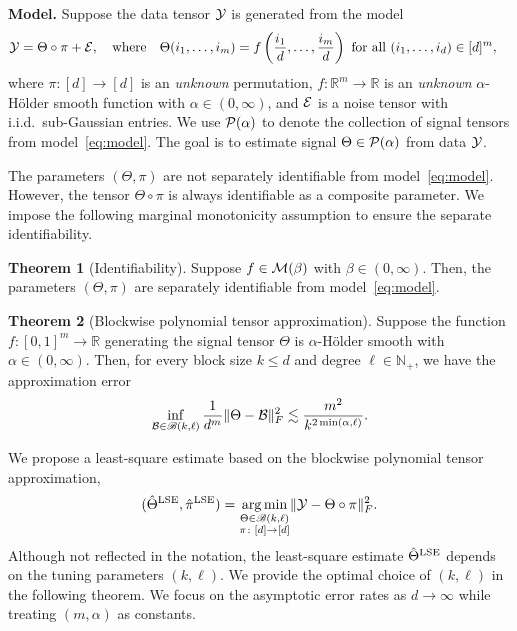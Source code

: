 \documentclass[11pt]{article}
\theoremstyle{definition}
\newtheorem{thm}{Theorem}
\def\caliB{\mathscr{B}}
\begin{document}
{\bf Model.} Suppose the data tensor $\mathcal{Y}$ is generated from the model
\begin{align}\label{eq:model}
\mathcal{Y}=\Theta\circ \pi+\mathcal{E},\quad \text{where}\quad \Theta(i_1,\ldots,i_m)&=f\left({i_1\over d}, \ldots,{i_m\over d}\right)\ \text{for all }(i_1,\ldots,i_d)\in[d]^m,
\end{align}
where $\pi\colon[d]\to[d]$ is an \emph{unknown} permutation, $f\colon \mathbb{R}^m\to\mathbb{R}$ is an \emph{unknown} $\alpha$-H\"older smooth function with $\alpha\in(0,\infty)$, and $\mathcal{E}$ is a noise tensor with i.i.d.\ sub-Gaussian entries. We use $\mathcal{P}(\alpha)$ to denote the collection of signal tensors from model~\eqref{eq:model}. The goal is to estimate signal $\Theta\in\mathcal{P}(\alpha)$ from data $\mathcal{Y}$. 


The parameters $(\Theta, \pi)$ are not separately identifiable from model~\eqref{eq:model}. However, the tensor $\Theta\circ \pi$ is always identifiable as a composite parameter. We impose the following marginal monotonicity assumption to ensure the separate identifiability. 
\begin{thm}[Identifiability] Suppose $f\in \mathcal{M}(\beta)$ with $\beta\in(0,\infty)$. Then, the parameters $(\Theta,\pi)$ are separately identifiable from model~\eqref{eq:model}. 
\end{thm}

\begin{thm}[Blockwise polynomial tensor approximation]\label{thm:approx} Suppose the function $f\colon[0,1]^m\to \mathbb{R}$ generating the signal tensor $\Theta$ is $\alpha$-H\"older smooth with $\alpha\in(0,\infty)$. Then, for every block size $k\leq d$ and degree $\ell\in\mathbb{N}_{+}$, we have the approximation error
\[
\inf_{\tB\in \caliB(k,\ell)}{1\over d^m}\FnormSize{}{\Theta-\tB}^2 \lesssim {m^2\over k^{2\min(\alpha, \ell)}}.
\]
\end{thm}

We propose a least-square estimate based on the blockwise polynomial tensor approximation,
\[
(\hat \Theta^\textup{LSE},\hat \pi^\textup{LSE})=\argmin_{\substack{\Theta\in \caliB(k,\ell)\\ \pi\colon[d]\to[d]}}\FnormSize{}{\tY-\Theta\circ \pi}^2.
\]
Although not reflected in the notation, the least-square estimate $\hat \Theta^\textup{LSE}$ depends on the tuning parameters $(k,\ell)$. We provide the optimal choice of $(k,\ell)$ in the following theorem.  We focus on the asymptotic error rates as $d\to\infty$ while treating $(m,\alpha)$ as constants. 
\end{document}
